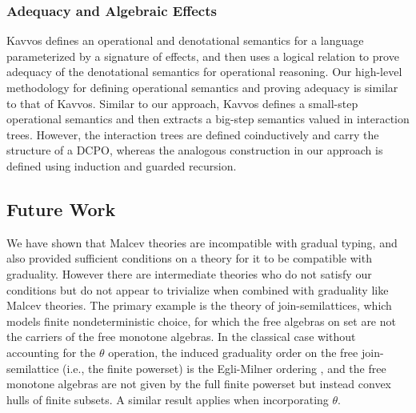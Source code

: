 \documentclass[acmsmall,screen,review,anonymous]{acmart}
\theoremstyle{remark}
\begin{document}
\subsubsection{Adequacy and Algebraic Effects}

Kavvos \cite{kavvos-2025} defines an operational and denotational semantics for
a language parameterized by a signature of effects, and then uses a logical
relation to prove adequacy of the denotational semantics for operational
reasoning. Our high-level methodology for defining operational semantics and
proving adequacy is similar to that of Kavvos. Similar to our approach, Kavvos
defines a small-step operational semantics and then extracts a big-step
semantics valued in interaction trees. However, the interaction trees are
defined coinductively and carry the structure of a DCPO, whereas the analogous
construction in our approach is defined using induction and guarded recursion.



\subsection{Future Work}\label{sec:future-work}

We have shown that Malcev theories are incompatible with gradual typing, and also provided sufficient conditions on a theory for it to be compatible with graduality. However there are intermediate theories who do not satisfy our conditions but do not appear to trivialize when combined with graduality like Malcev theories.
%
The primary example is the theory of join-semilattices, which models
finite nondeterministic choice, for which the free algebras on set are
not the carriers of the free monotone algebras. In the classical case
without accounting for the $\theta$ operation, the induced graduality
order on the free join-semilattice (i.e., the finite powerset) is the
Egli-Milner ordering \cite{plotkin-1976}, and the free monotone
algebras are not given by the full finite powerset but instead convex
hulls of finite subsets. A similar result applies when incorporating $\theta$.
\end{document}
